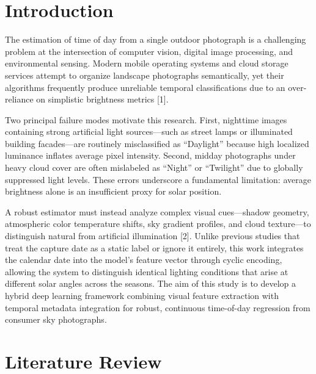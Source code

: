 \documentclass[9pt, a4paper, twocolumn]{article}
\begin{document}
\section{Introduction}
The estimation of time of day from a single outdoor photograph is a challenging problem at the intersection of computer vision, digital image processing, and environmental sensing. Modern mobile operating systems and cloud storage services attempt to organize landscape photographs semantically, yet their algorithms frequently produce unreliable temporal classifications due to an over-reliance on simplistic brightness metrics [1].

Two principal failure modes motivate this research. First, nighttime images containing strong artificial light sources---such as street lamps or illuminated building facades---are routinely misclassified as ``Daylight'' because high localized luminance inflates average pixel intensity. Second, midday photographs under heavy cloud cover are often mislabeled as ``Night'' or ``Twilight'' due to globally suppressed light levels. These errors underscore a fundamental limitation: average brightness alone is an insufficient proxy for solar position.

A robust estimator must instead analyze complex visual cues---shadow geometry, atmospheric color temperature shifts, sky gradient profiles, and cloud texture---to distinguish natural from artificial illumination [2]. Unlike previous studies that treat the capture date as a static label or ignore it entirely, this work integrates the calendar date into the model's feature vector through cyclic encoding, allowing the system to distinguish identical lighting conditions that arise at different solar angles across the seasons. The aim of this study is to develop a hybrid deep learning framework combining visual feature extraction with temporal metadata integration for robust, continuous time-of-day regression from consumer sky photographs.


\section{Literature Review}
\end{document}

